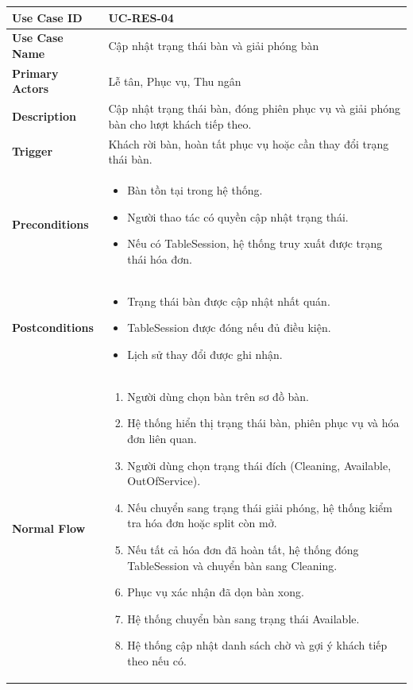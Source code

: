 \begin{longtable}{|p{4cm}|p{10cm}|}
\hline
\textbf{Use Case ID} & UC-RES-04 \\ \hline
\textbf{Use Case Name} & Cập nhật trạng thái bàn và giải phóng bàn \\ \hline
\textbf{Primary Actors} & Lễ tân, Phục vụ, Thu ngân \\ \hline

\textbf{Description} & Cập nhật trạng thái bàn, đóng phiên phục vụ và giải phóng bàn cho lượt khách tiếp theo. \\ \hline

\textbf{Trigger} & Khách rời bàn, hoàn tất phục vụ hoặc cần thay đổi trạng thái bàn. \\ \hline

\textbf{Preconditions} &
\begin{itemize}[leftmargin=*, noitemsep]
  \item Bàn tồn tại trong hệ thống.
  \item Người thao tác có quyền cập nhật trạng thái.
  \item Nếu có \textsf{TableSession}, hệ thống truy xuất được trạng thái hóa đơn.
\end{itemize} \\ \hline

\textbf{Postconditions} &
\begin{itemize}[leftmargin=*, noitemsep]
  \item Trạng thái bàn được cập nhật nhất quán.
  \item \textsf{TableSession} được đóng nếu đủ điều kiện.
  \item Lịch sử thay đổi được ghi nhận.
\end{itemize} \\ \hline

\textbf{Normal Flow} &
\begin{enumerate}[leftmargin=*, noitemsep]
  \item Người dùng chọn bàn trên sơ đồ bàn.
  \item Hệ thống hiển thị trạng thái bàn, phiên phục vụ và hóa đơn liên quan.
  \item Người dùng chọn trạng thái đích (\textsf{Cleaning}, \textsf{Available}, \textsf{OutOfService}).
  \item Nếu chuyển sang trạng thái giải phóng, hệ thống kiểm tra hóa đơn hoặc split còn mở.
  \item Nếu tất cả hóa đơn đã hoàn tất, hệ thống đóng \textsf{TableSession} và chuyển bàn sang \textsf{Cleaning}.
  \item Phục vụ xác nhận đã dọn bàn xong.
  \item Hệ thống chuyển bàn sang trạng thái \textsf{Available}.
  \item Hệ thống cập nhật danh sách chờ và gợi ý khách tiếp theo nếu có.
\end{enumerate} \\ \hline


\end{longtable}
